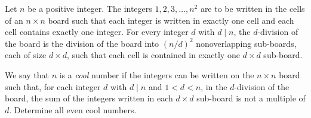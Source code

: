 Let $n$ be a positive integer. The integers $1, 2, 3, \ldots, n^2$ are to be written in the cells of an $n \times n$ board such that each integer is written in exactly one cell and each cell contains exactly one integer. For every integer $d$ with $d \mid n$, the $d$-division of the board is the division of the board into $(n/d)^2$ nonoverlapping sub-boards, each of size $d \times d$, such that each cell is contained in exactly one $d \times d$ sub-board.

We say that $n$ is a \emph{cool} number if the integers can be written on the $n \times n$ board such that, for each integer $d$ with $d \mid n$ and $1 < d < n$, in the $d$-division of the board, the sum of the integers written in each $d \times d$ sub-board is not a multiple of $d$. Determine all even cool numbers.
